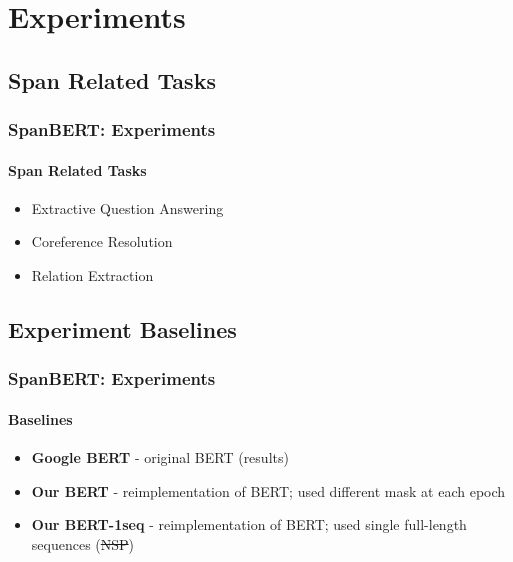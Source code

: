 \documentclass[12pt]{beamer}
\begin{document}
	\section{Experiments}
	\subsection{Span Related Tasks}
	\begin{frame}
		\frametitle{SpanBERT: Experiments}
		\framesubtitle{Span Related Tasks}
		
		\large
		\begin{itemize}
			\item Extractive Question Answering \newline
			\item Coreference Resolution \newline
			\item Relation Extraction \newline
		\end{itemize}
	
	\end{frame}	
	
	\subsection{Experiment Baselines}
	\begin{frame}
		\frametitle{SpanBERT: Experiments}
		\framesubtitle{Baselines}
		
		\large
		\begin{itemize}
			\item \textbf{Google BERT} - original BERT (results) \newline
			\item \textbf{Our BERT} - reimplementation of BERT; used different mask at each epoch \newline
			\item \textbf{Our BERT-1seq} - reimplementation of BERT; used single full-length sequences (\sout{NSP})
 		\end{itemize}
		
	\end{frame}	
	
\end{document}
